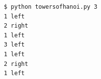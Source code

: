\documentclass[8pt,a4paper,compress]{beamer}
\begin{document}
\begin{frame}[fragile]
\begin{minipage}{200pt}
\begin{lstlisting}[language={}]
$ python towersofhanoi.py 3
1 left
2 right
1 left
3 left
1 left
2 right
1 left
\end{lstlisting}
\end{minipage}
\begin{minipage}{100pt}
\end{minipage}
\end{frame}
\end{document}
